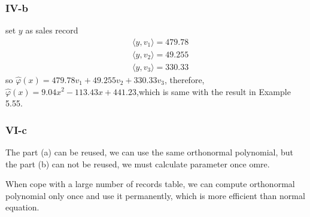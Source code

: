 \documentclass[a4paper]{article}
\newcommand{\innerProduct}[2]{\langle #1 , #2\rangle}
\begin{document}
\subsubsection*{IV-b}
set \(y\) as sales record
\begin{align*}
    &\innerProduct{y}{v_1} = 479.78 \\\
&\innerProduct{y}{v_2} = 49.255\\
&\innerProduct{y}{v_3} =330.33
\end{align*}
so \(\hat{\varphi}(x) = 479.78 v_1 + 49.255 v_2 + 330.33 v_3\), therefore, \(\hat{\varphi}(x) = 9.04x^2 -113.43x + 441.23\),which is 
same with the result in Example 5.55.

\subsubsection*{VI-c}
The part (a) can be reused, we can use the same orthonormal polynomial, but the part (b) can not be reused, we must calculate parameter once omre.

When cope with a large number of records table, we can compute orthonormal polynomial only once and use it permanently, which is more efficient than normal equation.   
\end{document}
